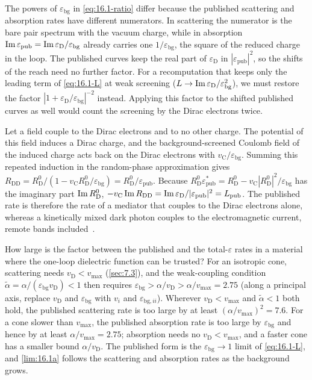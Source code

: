 \noindent The powers of $\varepsilon_{\mathrm{bg}}$ in \cref{eq:16.1-ratio} differ because the published scattering and absorption rates have different numerators. In scattering the numerator is the bare pair spectrum with the vacuum charge, while in absorption $\operatorname{Im}\varepsilon_{\mathrm{pub}} = \operatorname{Im}\varepsilon_{\mathrm{D}}/\varepsilon_{\mathrm{bg}}$ already carries one $1/\varepsilon_{\mathrm{bg}}$, the square of the reduced charge in the loop. The published curves keep the real part of $\varepsilon_{\mathrm{D}}$ in $|\varepsilon_{\mathrm{pub}}|^2$, so the shifts of the reach need no further factor. For a recomputation that keeps only the leading term of \cref{eq:16.1-L} at weak screening ($L \to \operatorname{Im}\varepsilon_{\mathrm{D}}/\varepsilon_{\mathrm{bg}}^2$), we must restore the factor $|1 + \varepsilon_{\mathrm{D}}/\varepsilon_{\mathrm{bg}}|^{-2}$ instead. Applying this factor to the shifted published curves as well would count the screening by the Dirac electrons twice.

Let a field couple to the Dirac electrons and to no other charge. The potential of this field induces a Dirac charge, and the background-screened Coulomb field of the induced charge acts back on the Dirac electrons with $v_{\mathrm{C}}/\varepsilon_{\mathrm{bg}}$. Summing this repeated induction in the random-phase approximation gives $R_{\mathrm{DD}} = R^0_{\mathrm{D}}/(1 - v_{\mathrm{C}}R^0_{\mathrm{D}}/\varepsilon_{\mathrm{bg}}) = R^0_{\mathrm{D}}/\varepsilon_{\mathrm{pub}}$. Because $R^0_{\mathrm{D}}\varepsilon_{\mathrm{pub}}^* = R^0_{\mathrm{D}} - v_{\mathrm{C}}|R^0_{\mathrm{D}}|^2/\varepsilon_{\mathrm{bg}}$ has the imaginary part $\operatorname{Im} R^0_{\mathrm{D}}$, $-v_{\mathrm{C}}\operatorname{Im} R_{\mathrm{DD}} = \operatorname{Im}\varepsilon_{\mathrm{D}}/|\varepsilon_{\mathrm{pub}}|^2 = L_{\mathrm{pub}}$. The published rate is therefore the rate of a mediator that couples to the Dirac electrons alone, whereas a kinetically mixed dark photon couples to the electromagnetic current, remote bands included~\cite[Eq.~(2.1)]{hochberg2018detection}.

How large is the factor between the published and the total-$\varepsilon$ rates in a material where the one-loop dielectric function can be trusted? For an isotropic cone, scattering needs $v_{\mathrm{D}} < v_{\mathrm{max}}$ (\cref{sec:7.3}), and the weak-coupling condition $\tilde\alpha = \alpha/(\varepsilon_{\mathrm{bg}}v_{\mathrm{D}}) < 1$ then requires $\varepsilon_{\mathrm{bg}} > \alpha/v_{\mathrm{D}} > \alpha/v_{\mathrm{max}} = 2.75$ (along a principal axis, replace $v_{\mathrm{D}}$ and $\varepsilon_{\mathrm{bg}}$ with $v_i$ and $\varepsilon_{\mathrm{bg},ii}$). Wherever $v_{\mathrm{D}} < v_{\mathrm{max}}$ and $\tilde\alpha < 1$ both hold, the published scattering rate is too large by at least $(\alpha/v_{\mathrm{max}})^2 = 7.6$. For a cone slower than $v_{\mathrm{max}}$, the published absorption rate is too large by $\varepsilon_{\mathrm{bg}}$ and hence by at least $\alpha/v_{\mathrm{max}} = 2.75$; absorption needs no $v_{\mathrm{D}} < v_{\mathrm{max}}$, and a faster cone has a smaller bound $\alpha/v_{\mathrm{D}}$. The published form is the $\varepsilon_{\mathrm{bg}} \to 1$ limit of \cref{eq:16.1-L}, and \cref{lim:16.1a} follows the scattering and absorption rates as the background grows.

